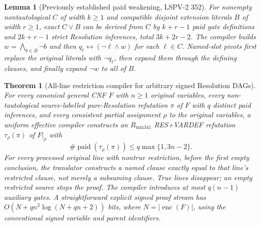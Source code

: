 \documentclass[11pt]{article}
\newtheorem{theorem}{Theorem}
\newtheorem{lemma}{Lemma}
\begin{document}
\begin{lemma}[Previously established paid weakening, LSPV-2 352]
For nonempty nontautological $C$ of width $k\ge1$ and compatible disjoint extension literals $B$ of width $r\ge1$, exact $C\vee B$ can be derived from $C$ by $k+r-1$ paid gate definitions and $2k+r-1$ strict Resolution inferences, total $3k+2r-2$. The compiler builds $w=\bigwedge_{b\in B}\neg b$ and then $q_\ell\leftrightarrow(\neg\ell\wedge w)$ for each $\ell\in C$. Named-slot pivots first replace the original literals with $\neg q_\ell$, then expand them through the defining clauses, and finally expand $\neg w$ to all of $B$.
\end{lemma}
\begin{theorem}[All-line restriction compiler for arbitrary signed Resolution DAGs]
For every canonical general CNF $F$ with $n\ge1$ original variables, every non-tautological source-labelled pure-Resolution refutation $\pi$ of $F$ with $q$ distinct paid inferences, and every consistent partial assignment $\rho$ to the original variables, a uniform effective compiler constructs an $R_{\mathrm{mix341}}$ RES+VARDEF refutation $\tau_\rho(\pi)$ of $F|_\rho$ with
\[
\boxed{\#\operatorname{paid}(\tau_\rho(\pi))\le q\max\{1,3n-2\}.}
\]
For every processed original line with nontrue restriction, before the first empty conclusion, the translator constructs a named clause \emph{exactly equal} to that line's restricted clause, not merely a subsuming clause. True lines disappear; an empty restricted source stops the proof. The compiler introduces at most $q(n-1)$ auxiliary gates. A straightforward explicit signed proof stream has $O(N+qn^2\log(N+qn+2))$ bits, where $N=|\operatorname{enc}(F)|$, using the conventional signed variable and parent identifiers.
\end{theorem}
\end{document}
